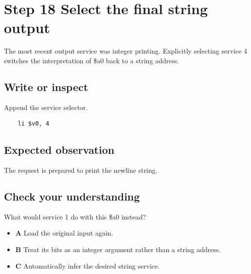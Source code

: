 \section{Step 18 Select the final string
  output}\label{001-console-calculation-s18-step-18-select-the-final-string-output}

The most recent output service was integer printing. Explicitly
selecting service 4 switches the interpretation of \$a0 back to a string
address.

\subsection{Write or
  inspect}\label{001-console-calculation-s18-write-or-inspect}

Append the service selector.

\begin{verbatim}
    li $v0, 4
\end{verbatim}

\subsection{Expected
  observation}\label{001-console-calculation-s18-expected-observation}

The request is prepared to print the newline string.

\subsection{Check your
  understanding}\label{001-console-calculation-s18-check-your-understanding}

What would service 1 do with this \$a0 instead?

\begin{itemize}
  \tightlist
  \item
        \textbf{A} Load the original input again.
  \item
        \textbf{B} Treat its bits as an integer argument rather than a string
        address.
  \item
        \textbf{C} Automatically infer the desired string service.
\end{itemize}

